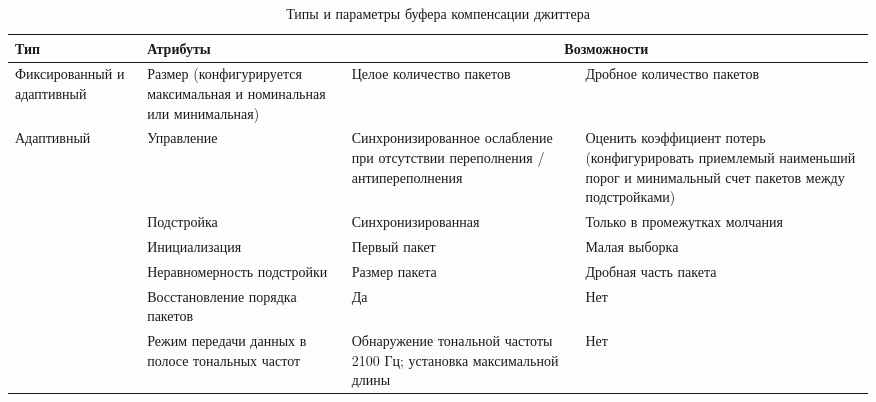 \begin{table} [htbp]
  \centering
  \parbox{15cm}{\caption{Типы и параметры буфера компенсации джиттера}\label{TypeBuff}}
\begin{tabular}{|p{3cm}||p{4cm}|p{4cm}|p{4cm}|}
    \hline
    \hline
    Тип                        & Атрибуты                                                            & \multicolumn{2}{|c|}{Возможности}                                                                                                                                                                    \\ \hline \hline
    Фиксированный и адаптивный & Размер (конфигурируется максимальная и номинальная или минимальная) & Целое количество пакетов                                                     & Дробное количество пакетов                                                                                             \\ \hline
\multirow{6}{*}{Адаптивный}    & Управление                                                          & Синхронизированное ослабление при отсутствии переполнения / антипереполнения & Оценить коэффициент потерь (конфигурировать приемлемый наименьший порог и минимальный счет пакетов между подстройками) \\ 
\cline{2-4}
                               & Подстройка                                                          & Синхронизированная                                                           & Только в промежутках молчания                                                                                          \\
\cline{2-4}
                               & Инициализация                                                       & Первый пакет                                                                 & Малая выборка                                                                                                          \\ 
\cline{2-4}
                               & Неравномерность подстройки                                          & Размер пакета                                                                & Дробная часть пакета                                                                                                   \\ 
\cline{2-4}
                               & Восстановление порядка пакетов                                      & Да                                                                           & Нет                                                                                                                    \\ 
\cline{2-4}
                               & Режим передачи данных в полосе тональных частот                     & Обнаружение тональной частоты 2100 Гц; установка максимальной длины          & Нет                                                                                                                    \\ 
\hline
    \end{tabular}
\end{table}


